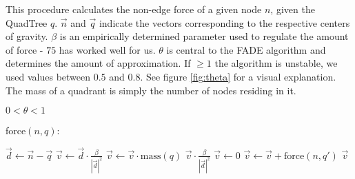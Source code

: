 \documentclass[a4paper,11pt,titlepage]{article}
\begin{document}
\begin{algorithm}
  \caption{This procedure calculates the non-edge force of a given node $n$, given the
    QuadTree $q$. $\vec{n}$ and $\vec{q}$ indicate the vectors corresponding to the
    respective centers of gravity. $\beta$ is an empirically determined parameter used to
    regulate the amount of force - $75$ has worked well for us. $\theta$ is central to the
    FADE algorithm and determines the amount of approximation. If $\geq 1$ the algorithm
    is unstable, we used values between $0.5$ and $0.8$. See figure \ref{fig:theta} for a
    visual explanation. The mass of a quadrant is simply the number of nodes residing in
    it. }
  \label{proc:FADE}

  \begin{algorithmic}
    \REQUIRE $0 < \theta < 1$
  \end{algorithmic}
  force$(n, q)$:
  \begin{algorithmic}
    \STATE $\vec{d} \gets \vec{n} - \vec{q}$
    \STATE $\vec{v} \gets \vec{d} \cdot \frac{\beta}{|{\vec{d}}|^2}$
    \STATE $\vec{v} \gets \vec{v} \cdot \textrm{mass}(q)$
    \RETURN $\vec{v} \cdot \frac{\beta}{|{\vec{d}}|^2}$
    \ELSE
    \STATE $\vec{v} \gets 0$
    \STATE $\vec{v} \gets \vec{v} + \textrm{force}(n, q')$
    \ENDFOR
    \RETURN $\vec{v}$
    \ENDIF
  \end{algorithmic}
\end{algorithm}
\end{document}
